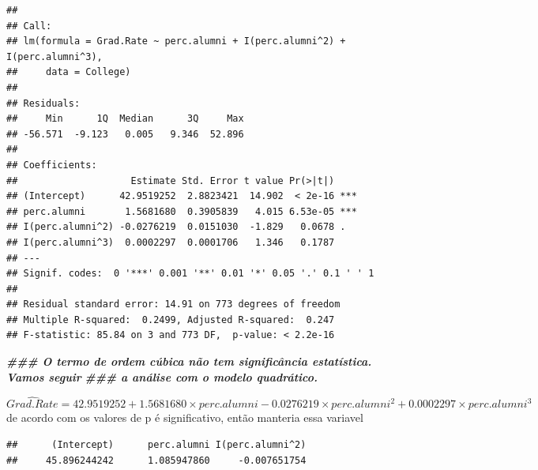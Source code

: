 \documentclass[
]{article}
\newenvironment{Shaded}{\begin{snugshade}}{\end{snugshade}}
\newcommand{\DocumentationTok}[1]{\textcolor[rgb]{0.56,0.35,0.01}{\textbf{\textit{#1}}}}
\newcommand{\NormalTok}[1]{#1}
\newcommand{\SpecialCharTok}[1]{\textcolor[rgb]{0.81,0.36,0.00}{\textbf{#1}}}
\begin{document}
\begin{verbatim}
## 
## Call:
## lm(formula = Grad.Rate ~ perc.alumni + I(perc.alumni^2) + I(perc.alumni^3), 
##     data = College)
## 
## Residuals:
##     Min      1Q  Median      3Q     Max 
## -56.571  -9.123   0.005   9.346  52.896 
## 
## Coefficients:
##                    Estimate Std. Error t value Pr(>|t|)    
## (Intercept)      42.9519252  2.8823421  14.902  < 2e-16 ***
## perc.alumni       1.5681680  0.3905839   4.015 6.53e-05 ***
## I(perc.alumni^2) -0.0276219  0.0151030  -1.829   0.0678 .  
## I(perc.alumni^3)  0.0002297  0.0001706   1.346   0.1787    
## ---
## Signif. codes:  0 '***' 0.001 '**' 0.01 '*' 0.05 '.' 0.1 ' ' 1
## 
## Residual standard error: 14.91 on 773 degrees of freedom
## Multiple R-squared:  0.2499, Adjusted R-squared:  0.247 
## F-statistic: 85.84 on 3 and 773 DF,  p-value: < 2.2e-16
\end{verbatim}

\begin{Shaded}
\begin{Highlighting}[]
\DocumentationTok{\#\#\# O termo de ordem cúbica não tem significância estatística. Vamos seguir}
\DocumentationTok{\#\#\# a análise com o modelo quadrático.}
\end{Highlighting}
\end{Shaded}

\[
\hat{Grad.Rate} = 42.9519252 + 1.5681680 \times perc.alumni -0.0276219 \times perc.alumni^2 + 0.0002297 \times perc.alumni^3
\] de acordo com os valores de p é significativo, então manteria essa
variavel

\begin{Shaded}
\end{Shaded}

\begin{verbatim}
##      (Intercept)      perc.alumni I(perc.alumni^2) 
##     45.896244242      1.085947860     -0.007651754
\end{verbatim}

\begin{Shaded}
\end{Shaded}
\end{document}
